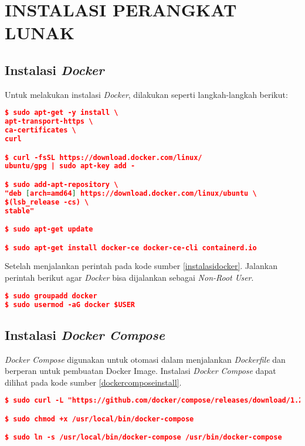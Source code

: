 \chapter{INSTALASI PERANGKAT LUNAK}

\section*{Instalasi \textit{Docker}}
	Untuk melakukan instalasi \textit{Docker}, dilakukan seperti langkah-langkah berikut:
\begin{lstlisting}[frame=single,tabsize=2,breaklines,caption={Perintah instalasi Docker },label=instalasidocker, captionpos=b, language=json,numbers=none]
$ sudo apt-get -y install \
apt-transport-https \
ca-certificates \
curl

$ curl -fsSL https://download.docker.com/linux/
ubuntu/gpg | sudo apt-key add -

$ sudo add-apt-repository \
"deb [arch=amd64] https://download.docker.com/linux/ubuntu \
$(lsb_release -cs) \
stable"

$ sudo apt-get update

$ sudo apt-get install docker-ce docker-ce-cli containerd.io
\end{lstlisting}
	
	Setelah menjalankan perintah pada kode sumber \ref{instalasidocker}. Jalankan perintah berikut agar \textit{Docker} bisa dijalankan sebagai \textit{Non-Root User}.
\begin{lstlisting}[frame=single,tabsize=2,breaklines,caption={Perintah mengubah hak User },label=nonrootuser, captionpos=b, language=json,numbers=none]
$ sudo groupadd docker
$ sudo usermod -aG docker $USER
\end{lstlisting}

\section*{Instalasi \textit{Docker Compose}}
\textit{Docker Compose} digunakan untuk otomasi dalam menjalankan \textit{Dockerfile} dan berperan untuk pembuatan Docker Image. Instalasi \textit{Docker Compose} dapat dilihat pada kode sumber \ref{dockercomposeinstall}.

\begin{lstlisting}[frame=single,tabsize=2,breaklines,caption={Perintah instalasi Docker Compose},label=dockercomposeinstall, captionpos=b, language=json,numbers=none]
$ sudo curl -L "https://github.com/docker/compose/releases/download/1.24.0/docker-compose-$(uname -s)-$(uname -m)" -o /usr/local/bin/docker-compose

$ sudo chmod +x /usr/local/bin/docker-compose

$ sudo ln -s /usr/local/bin/docker-compose /usr/bin/docker-compose
\end{lstlisting}

